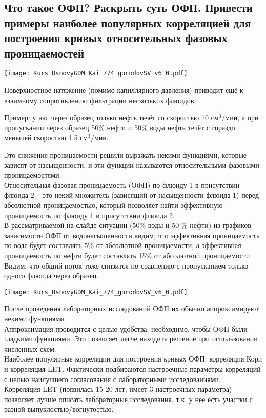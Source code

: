 

\subsection{Что такое ОФП? Раскрыть суть ОФП. Привести примеры наиболее популярных корреляцией для построения кривых относительных фазовых проницаемостей}

\texttt{[image: Kurs\_OsnovyGDM\_Kai\_774\_gorodovSV\_v6\_0.pdf]}

Поверхностное натяжение (помимо капиллярного давления) приводит ещё к взаимному сопротивлению фильтрации нескольких флюидов.

Пример: у нас через образец только нефть течёт со скоростью 10 см$^3$/мин, а при пропускании через образец 50\% нефти и 50\% воды нефть течёт с гораздо меньшей скоростью 1.5 см$^3$/мин.

Это снижение проницаемости решили выражать некими функциями, которые зависят от насыщенности, и эти функции называются относительными фазовыми проницаемостями.
\\

Относительная фазовая проницаемость (ОФП) по флюиду 1 в присутствии флюида 2 -- это некий множитель (зависящий от насыщенности флюида 1) перед абсолютной проницаемостью, который позволяет найти эффективную проницаемость по флюиду 1 в присутствии флюида 2.
\\

В рассматриваемой на слайде ситуации (50\% воды и 50 \% нефти) из графиков зависимости ОФП от водонасыщенности видим, что эффективная проницаемость по воде будет составлять 5\% от абсолютной проницаемости, а эффективная проницаемость по нефти будет составлять 15\% от абсолютной проницаемости.
Видим, что общий поток тоже снизится по сравнению с пропусканием только одного флюида через образец.


\texttt{[image: Kurs\_OsnovyGDM\_Kai\_774\_gorodovSV\_v6\_0.pdf]}

После проведения лабораторных исследований ОФП их обычно аппроксимируют некими функциями.
\\

Аппроксимация проводится с целью удобства: необходимо, чтобы ОФП были гладкими функциями.
Это позволяет легче находить решение при использовании численных схем.
\\

Наиболее популярные корреляции для построения кривых ОФП: корреляция Кори и корреляция LET.
Фактически подбираются настроечные параметры корреляций с целью наилучшего согласования с лабораторными исследованиями.
\\

Корреляция LET (появилась 15-20 лет; имеет 3 настроечных параметра) позволяет лучше описать лабораторные исследования, т.к. у неё есть участки с разной выпуклостью/вогнутостью.

